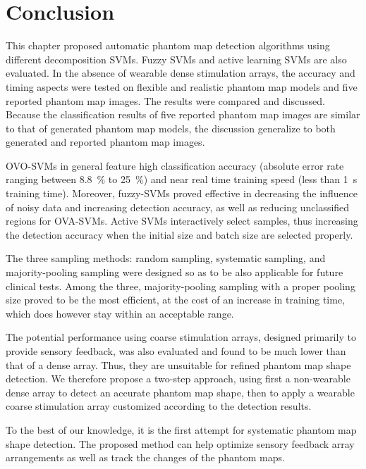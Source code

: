 \section{Conclusion}
\label{chap2:sec:summary}
This chapter proposed automatic phantom map detection algorithms using different decomposition SVMs. Fuzzy SVMs and active learning SVMs are also evaluated. 
In the absence of wearable dense stimulation arrays, the accuracy and timing aspects were tested on flexible and realistic phantom map models and five reported phantom map images. The results were compared and discussed. Because the classification results of five reported phantom map images are similar to that of generated phantom map models, the discussion generalize to both generated and reported phantom map images.

OVO-SVMs in general feature high classification accuracy (absolute error rate ranging between \SI{8.8}{\%} to \SI{25}{\%}) and near real time training speed (less than \SI{1}{s} training time). 
Moreover, fuzzy-SVMs proved effective in decreasing the influence of noisy data and increasing detection accuracy, as well as reducing unclassified regions for OVA-SVMs. Active SVMs interactively select samples, thus increasing the detection accuracy when the initial size and batch size are selected properly. 

The three sampling methods: random sampling, systematic sampling, and majority-pooling sampling were designed so as to be also applicable for future clinical tests.
Among the three, majority-pooling sampling with a proper pooling size proved to be the most efficient, at the cost of an increase in training time, which does however stay within an acceptable range.

The potential performance using coarse stimulation arrays, designed primarily to provide sensory feedback, was also evaluated and found to be much lower than that of a dense array. Thus, they are unsuitable for refined phantom map shape detection. We therefore propose a two-step approach, using first a non-wearable dense array to detect an accurate phantom map shape, then to apply a wearable coarse stimulation array customized according to the detection results.


To the best of our knowledge, it is the first attempt for systematic phantom map shape detection. The proposed method can help optimize sensory feedback array arrangements as well as track the changes of the phantom maps.

